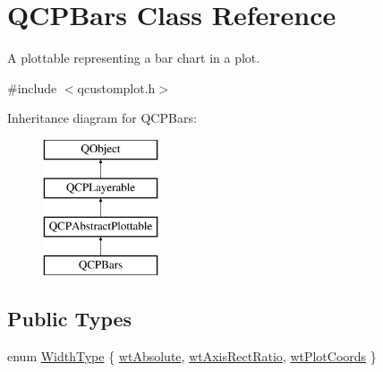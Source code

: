 \hypertarget{class_q_c_p_bars}{}\section{Q\+C\+P\+Bars Class Reference}
\label{class_q_c_p_bars}


A plottable representing a bar chart in a plot.  




{\ttfamily \#include $<$qcustomplot.\+h$>$}

Inheritance diagram for Q\+C\+P\+Bars\+:\begin{figure}[H]
\begin{center}
\leavevmode
\includegraphics[height=4.000000cm]{class_q_c_p_bars}
\end{center}
\end{figure}
\subsection*{Public Types}
\begin{DoxyCompactItemize}
\item 
enum \hyperlink{class_q_c_p_bars_a65dbbf1ab41cbe993d71521096ed4649}{Width\+Type} \{ \hyperlink{class_q_c_p_bars_a65dbbf1ab41cbe993d71521096ed4649ab74315c9aa77df593c58dd25dfc0de35}{wt\+Absolute}, 
\hyperlink{class_q_c_p_bars_a65dbbf1ab41cbe993d71521096ed4649a90bc09899361ad3422ff277f7c790ffe}{wt\+Axis\+Rect\+Ratio}, 
\hyperlink{class_q_c_p_bars_a65dbbf1ab41cbe993d71521096ed4649aad3cc60ae1bfb1160a30237bee9eaf10}{wt\+Plot\+Coords}
 \}
\end{DoxyCompactItemize}

